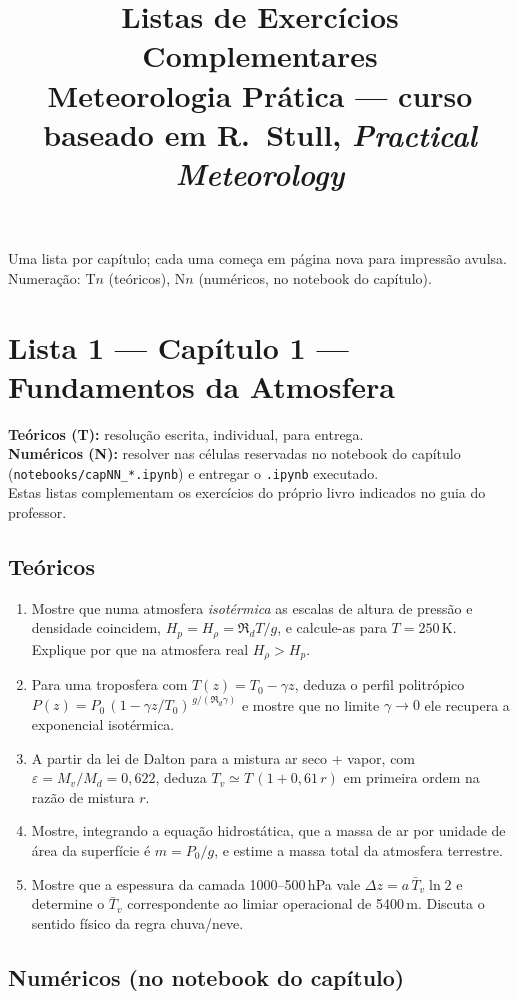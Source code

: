 \documentclass[11pt]{article}
\title{Listas de Exercícios Complementares\\
{\large Meteorologia Prática --- curso baseado em R.~Stull,
\emph{Practical Meteorology}}}
\author{}
\date{}
\newcommand{\instrucoes}{%
\begin{caixalista}
\textbf{Teóricos (T):} resolução escrita, individual, para entrega.\\
\textbf{Numéricos (N):} resolver nas células reservadas no notebook do
capítulo (\texttt{notebooks/capNN\_*.ipynb}) e entregar o
\texttt{.ipynb} executado.\\
Estas listas complementam os exercícios do próprio livro indicados no
guia do professor.
\end{caixalista}}
\begin{document}
\maketitle
\thispagestyle{fancy}

\noindent Uma lista por capítulo; cada uma começa em página nova para
impressão avulsa. Numeração: T$n$ (teóricos), N$n$ (numéricos, no
notebook do capítulo).

\clearpage
\section*{Lista 1 --- Capítulo 1 --- Fundamentos da Atmosfera}
\instrucoes

\subsection*{Teóricos}

\begin{enumerate}[label=\textbf{T\arabic*.},itemsep=4pt]
  \item Mostre que numa atmosfera \emph{isotérmica} as escalas de altura de
        pressão e densidade coincidem, $H_p = H_\rho = \Re_d T/g$, e
        calcule-as para $T=250$\,K. Explique por que na atmosfera real
        $H_\rho > H_p$.
  \item Para uma troposfera com $T(z)=T_0-\gamma z$, deduza o perfil
        politrópico
        $P(z)=P_0\,(1-\gamma z/T_0)^{\,g/(\Re_d\gamma)}$
        e mostre que no limite $\gamma\to0$ ele recupera a exponencial
        isotérmica.
  \item A partir da lei de Dalton para a mistura ar seco + vapor, com
        $\varepsilon = M_v/M_d = 0{,}622$, deduza
        $T_v \simeq T\,(1+0{,}61\,r)$ em primeira ordem na razão de mistura
        $r$.
  \item Mostre, integrando a equação hidrostática, que a massa de ar por
        unidade de área da superfície é $m = P_0/g$, e estime a massa total
        da atmosfera terrestre.
  \item Mostre que a espessura da camada 1000--500\,hPa vale
        $\Delta z = a\,\bar T_v \ln 2$ e determine o $\bar T_v$
        correspondente ao limiar operacional de 5400\,m. Discuta o sentido
        físico da regra chuva/neve.
\end{enumerate}

\subsection*{Numéricos (no notebook do capítulo)}
\end{document}
